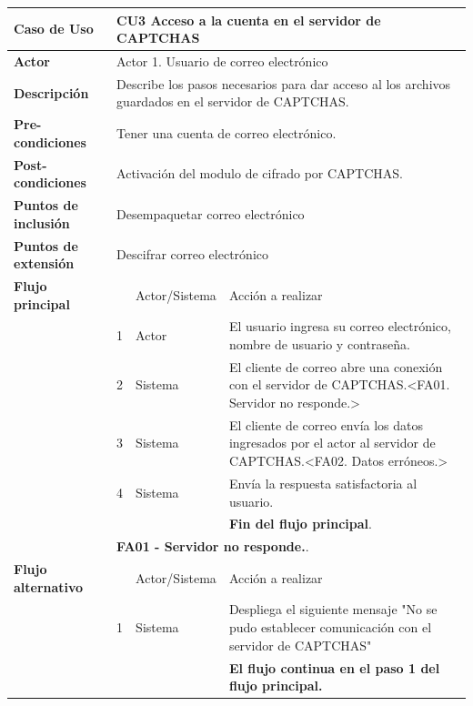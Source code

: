 \begin{longtable}[H]{| p{} | p{} |p{4cm}|p{5cm}|}
     \hline
     \textbf{Caso de Uso} &\multicolumn{3}{|l|}{CU3 Acceso a la cuenta en el servidor de CAPTCHAS}\\
     \hline
     \textbf{Actor} & \multicolumn{3}{|l|}{Actor 1. Usuario de correo electrónico}\\
     \hline
     \textbf{Descripción} & \multicolumn{3}{|p{10cm}|}{Describe los pasos necesarios para dar acceso al los archivos guardados en el servidor de CAPTCHAS.}\\
     \hline
     \textbf{Pre-condiciones} & \multicolumn{3}{|p{10cm}|}{Tener una cuenta de correo electrónico.}\\
     \hline
     \textbf{Post-condiciones} & \multicolumn{3}{|l|}{Activación del modulo de cifrado por CAPTCHAS.}\\
     \hline
     \textbf{Puntos de inclusión} & \multicolumn{3}{|l|}{Desempaquetar correo electrónico}\\
     \hline
     \textbf{Puntos de extensión} & \multicolumn{3}{|l|}{Descifrar correo electrónico}\\
     \hline
     \textbf{Flujo principal} & & Actor/Sistema & Acción a realizar\\
     \hline
     & 1 & Actor & El usuario ingresa su correo electrónico, nombre de usuario y contraseña.\\
     \hline
     & 2 & Sistema & El cliente de correo abre una conexión con el servidor de CAPTCHAS.<FA01. Servidor no responde.>\\
     \hline
     & 3 & Sistema & El cliente de correo envía los datos ingresados por  el actor al servidor de CAPTCHAS.<FA02. Datos erróneos.>\\
     \hline
     & 4 & Sistema & Envía la respuesta satisfactoria al usuario.\\
     \hline
     & & & \textbf{Fin del flujo principal}.\\
     \hline
     & \multicolumn{3}{|l|}{\textbf{FA01 - Servidor no responde.}.}\\
     \hline
     \textbf{Flujo alternativo} & & Actor/Sistema & Acción a realizar\\
     \hline
     & 1 & Sistema & Despliega el siguiente mensaje "No se pudo establecer comunicación con el servidor de CAPTCHAS"\\
     \hline
     & & & \textbf{El flujo continua en el paso 1 del flujo principal.}\\

\end{longtable}
